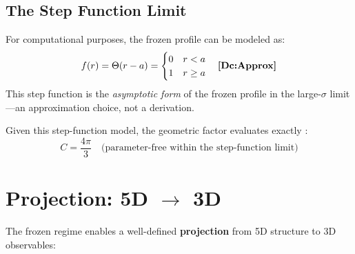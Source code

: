 \subsection{The Step Function Limit}

For computational purposes, the frozen profile can be modeled as:
\begin{equation}
f(r) = \Theta(r - a) = \begin{cases} 0 & r < a \\ 1 & r \geq a \end{cases}
\quad \textbf{[Dc:Approx]}
\end{equation}
This step function is the \textit{asymptotic form} of the frozen profile
in the large-$\sigma$ limit---an approximation choice, not a derivation.

Given this step-function model, the geometric factor evaluates exactly \tagDerSym{}:
\begin{equation}
C = \frac{4\pi}{3} \quad \text{(parameter-free within the step-function limit)}
\end{equation}

\section{Projection: 5D $\to$ 3D}
\label{sec:projection}

The frozen regime enables a well-defined \textbf{projection} from
5D structure to 3D observables:

